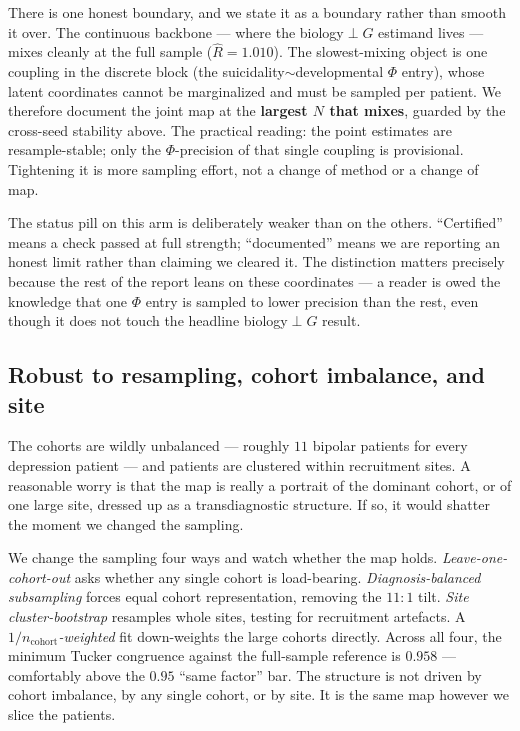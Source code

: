 There is one honest boundary, and we state it as a boundary rather than smooth it over. The continuous
backbone --- where the biology$\perp$$G$ estimand lives --- mixes cleanly at the full sample
($\widehat{R}=1.010$). The slowest-mixing object is one coupling in the discrete block (the
suicidality$\sim$developmental $\Phi$ entry), whose latent coordinates cannot be marginalized and must be
sampled per patient. We therefore document the joint map at the \textbf{largest $N$ that mixes}, guarded by
the cross-seed stability above. The practical reading: the point estimates are resample-stable; only the
$\Phi$-precision of that single coupling is provisional. Tightening it is more sampling effort, not a change of
method or a change of map.

\begin{methodsbox}
The status pill on this arm is deliberately weaker than on the others. ``Certified'' means a check passed at
full strength; ``documented'' means we are reporting an honest limit rather than claiming we cleared it. The
distinction matters precisely because the rest of the report leans on these coordinates --- a reader is owed
the knowledge that one $\Phi$ entry is sampled to lower precision than the rest, even though it does not touch
the headline biology$\perp$$G$ result.
\end{methodsbox}

\subsection{Robust to resampling, cohort imbalance, and site}
\label{sub:robust}
The cohorts are wildly unbalanced --- roughly $11$ bipolar patients for every depression patient
--- and patients are clustered within recruitment sites. A reasonable worry is that the map is really a
portrait of the dominant cohort, or of one large site, dressed up as a transdiagnostic structure. If so, it
would shatter the moment we changed the sampling.

We change the sampling four ways and watch whether the map holds. \emph{Leave-one-cohort-out} asks whether any
single cohort is load-bearing. \emph{Diagnosis-balanced subsampling} forces equal cohort representation,
removing the $11\!:\!1$ tilt. \emph{Site cluster-bootstrap} resamples whole sites, testing for recruitment
artefacts. A \emph{$1/n_{\text{cohort}}$-weighted} fit down-weights the large cohorts directly. Across all
four, the minimum Tucker congruence against the full-sample reference is $\mathbf{0.958}$ --- comfortably above
the $0.95$ ``same factor'' bar. The structure is not driven by cohort imbalance, by any single cohort, or by
site. It is the same map however we slice the patients.

